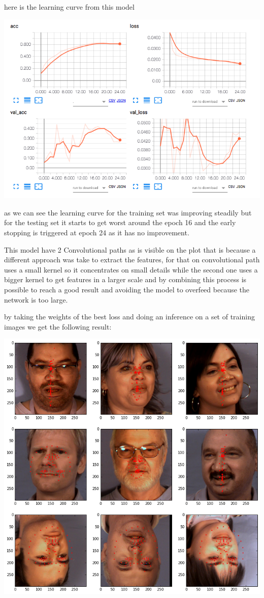\documentclass[11pt]{article}
\begin{document}
here is the learning curve from this model
\begin{center}
\includegraphics[width=.9\linewidth]{./images/mymodelLoss.png}
\end{center}

as we can see the learning curve for the training set was improving steadily
but for the testing set it starts to get worst  around the epoch 16 and the
early stopping is triggered at epoch 24 as it has no improvement.

This model have 2 Convolutional paths as is visible on the plot that is
because a different approach was take to extract the features, for that on
convolutional path uses a small kernel so it concentrates on small details
while the second one uses a bigger kernel to get features in a larger scale 
and by combining this process is possible to reach a good result and
avoiding the model to overfeed because the network is too large.

by taking the weights of the best loss and doing an inference on a set of
training images we get the following result: 

\begin{center}
\includegraphics[width=.9\linewidth]{./images/mymodelTest.png}
\end{center}
\end{document}
